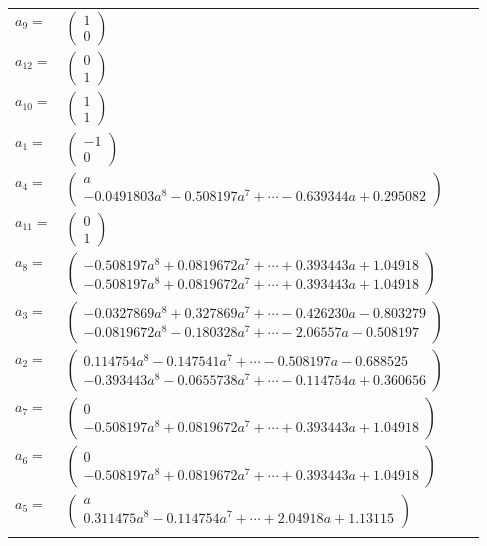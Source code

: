 \documentclass[1p]{elsarticle_modified}
\theoremstyle{definition}
\begin{document}
\begin{tabular}{m{7pt} m{180pt} m{7pt} m{180pt} }
\flushright $a_{9}=$&$\begin{pmatrix}1\\0\end{pmatrix}$ \\
\flushright $a_{12}=$&$\begin{pmatrix}0\\1\end{pmatrix}$ \\
\flushright $a_{10}=$&$\begin{pmatrix}1\\1\end{pmatrix}$ \\
\flushright $a_{1}=$&$\begin{pmatrix}-1\\0\end{pmatrix}$ \\
\flushright $a_{4}=$&$\begin{pmatrix}a\\-0.0491803 a^{8}-0.508197 a^{7}+\cdots-0.639344 a+0.295082\end{pmatrix}$ \\
\flushright $a_{11}=$&$\begin{pmatrix}0\\1\end{pmatrix}$ \\
\flushright $a_{8}=$&$\begin{pmatrix}-0.508197 a^{8}+0.0819672 a^{7}+\cdots+0.393443 a+1.04918\\-0.508197 a^{8}+0.0819672 a^{7}+\cdots+0.393443 a+1.04918\end{pmatrix}$ \\
\flushright $a_{3}=$&$\begin{pmatrix}-0.0327869 a^{8}+0.327869 a^{7}+\cdots-0.426230 a-0.803279\\-0.0819672 a^{8}-0.180328 a^{7}+\cdots-2.06557 a-0.508197\end{pmatrix}$ \\
\flushright $a_{2}=$&$\begin{pmatrix}0.114754 a^{8}-0.147541 a^{7}+\cdots-0.508197 a-0.688525\\-0.393443 a^{8}-0.0655738 a^{7}+\cdots-0.114754 a+0.360656\end{pmatrix}$ \\
\flushright $a_{7}=$&$\begin{pmatrix}0\\-0.508197 a^{8}+0.0819672 a^{7}+\cdots+0.393443 a+1.04918\end{pmatrix}$ \\
\flushright $a_{6}=$&$\begin{pmatrix}0\\-0.508197 a^{8}+0.0819672 a^{7}+\cdots+0.393443 a+1.04918\end{pmatrix}$ \\
\flushright $a_{5}=$&$\begin{pmatrix}a\\0.311475 a^{8}-0.114754 a^{7}+\cdots+2.04918 a+1.13115\end{pmatrix}$\\&\end{tabular}
\end{document}
